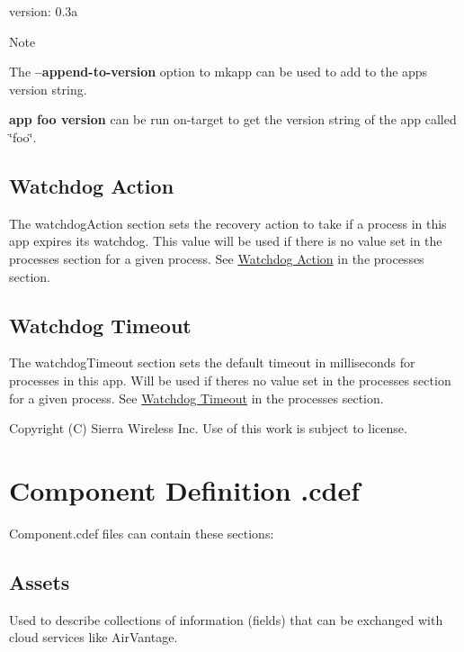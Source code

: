 \begin{DoxyVerb}version: 0.3a
\end{DoxyVerb}


\begin{DoxyNote}{Note}

\begin{DoxyItemize}
\item The {\bfseries {\ttfamily --append-\/to-\/version}} option to {\ttfamily mkapp} can be used to add to the app\textquotesingle{}s version string.
\item {\bfseries {\ttfamily app foo version}} can be run on-\/target to get the version string of the app called \char`\"{}foo\char`\"{}.
\end{DoxyItemize}
\end{DoxyNote}
\hypertarget{def_files_adef_defFilesAdef_watchdogAction}{}\subsection{Watchdog Action}\label{def_files_adef_defFilesAdef_watchdogAction}
The {\ttfamily watchdog\+Action} section sets the recovery action to take if a process in this app expires its watchdog. This value will be used if there is no value set in the processes section for a given process. See \hyperlink{def_files_adef_defFilesAdef_processWatchdogAction}{Watchdog Action} in the processes section.\hypertarget{def_files_adef_defFilesAdef_watchdogTimeout}{}\subsection{Watchdog Timeout}\label{def_files_adef_defFilesAdef_watchdogTimeout}
The {\ttfamily watchdog\+Timeout} section sets the default timeout in milliseconds for processes in this app. Will be used if there\textquotesingle{}s no value set in the processes section for a given process. See \hyperlink{def_files_adef_defFilesAdef_processWatchdogTimeout}{Watchdog Timeout} in the processes section.





Copyright (C) Sierra Wireless Inc. Use of this work is subject to license. \hypertarget{defFilesCdef}{}\section{Component Definition .cdef}\label{defFilesCdef}
{\ttfamily Component.\+cdef} files can contain these sections\+:\hypertarget{def_files_cdef_defFilesCdef_assets}{}\subsection{Assets}\label{def_files_cdef_defFilesCdef_assets}
Used to describe collections of information (fields) that can be exchanged with cloud services like Air\+Vantage.

